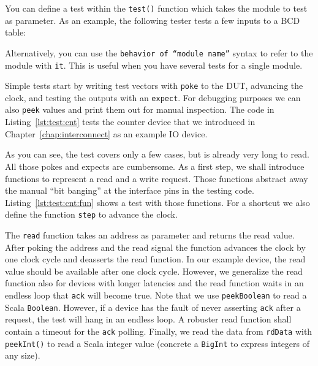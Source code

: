 \documentclass[%
    10pt,
    headinclude, footexclude,
    openright, %
    notitlepage,
    cleardoubleempty,
    headsepline,
    pointlessnumbers,
    bibtotoc, idxtotoc,
    ]{scrbook}
\newcommand{\code}[1]{{\small{\texttt{#1}}}}
\begin{document}
You can define a test within the \code{test()} function which takes the module to test as
parameter. As an example, the following tester tests a few inputs to  a BCD table:


Alternatively, you can use the \code{behavior of ``module name''} syntax to
refer to the module with \code{it}. This is useful when you have several tests for a
single module.


Simple tests start by writing test vectors with \code{poke} to the DUT, advancing the
clock, and testing the outputs with an \code{expect}. For debugging purposes we can also
\code{peek} values and print them out for manual inspection. The code in Listing~\ref{lst:test:cnt} tests the
counter device that we introduced in Chapter~\ref{chap:interconnect} as an example IO device.


As you can see, the test covers only a few cases, but is already very long to read.
All those pokes and expects are cumbersome. As a first step, we shall introduce
functions to represent a read and a write request. Those functions abstract away the manual
``bit banging'' at the interface pins in the testing code.
Listing~\ref{lst:test:cnt:fun} shows a test with those functions. For a shortcut we also define
the function \code{step} to advance the clock.


The \code{read} function takes an address
as parameter and returns the read value. After poking the address and the read signal the function
advances the clock by one clock cycle and deasserts the read function. In our example device,
the read value should be available after one clock cycle. However, we generalize the read function
also for devices with longer latencies and the read function waits in an endless loop that \code{ack}
will become true. Note that we use \code{peekBoolean} to read a Scala \code{Boolean}.
However, if a device has the fault of never asserting \code{ack} after a request,
the test will hang in an endless loop. A robuster read function shall contain a timeout for the \code{ack}
polling. Finally, we read the data from \code{rdData} with \code{peekInt()} to read a Scala integer
value (concrete a \code{BigInt} to express integers of any size).
\end{document}
